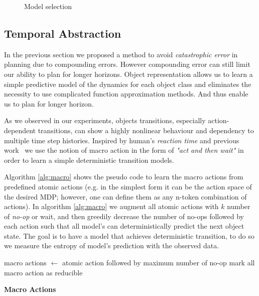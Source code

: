 \begin{figure}[tb]
    \centering

    \quad
    \quad
    \caption{Model selection}%
    
    \label{fig:pitfall:metaction}%
\end{figure}

\subsection{Temporal Abstraction}
In the previous section we proposed a method to avoid \textit{catastrophic error} in planning due to compounding errors. However compounding error can still limit our ability to plan for longer horizons. Object representation allows us to learn a simple predictive model of the dynamics for each object class and eliminates the necessity to use complicated function approximation methods. And thus enable us to plan for longer horizon.

As we observed in our experiments, objects transitions, especially action-dependent transitions, can show a highly nonlinear behaviour and dependency to multiple time step histories. Inspired by human's \textit{reaction time} and previous work~\citep{diuk2008object} we use the notion of macro action in the form of \textit{"act and then wait"} in order to learn a simple deterministic transition models. 

Algorithm \ref{alg:macro} shows the pseudo code to learn the macro actions from predefined atomic actions (e.g. in the simplest form it can be the action space of the desired MDP; however, one can define them as any n-token combination of actions). In algorithm \ref{alg:macro} we augment all atomic actions with $k$ number of \textit{no-op} or wait, and then greedily decrease the number of no-ops followed by each action such that all model's can deterministically predict the next object state. The  goal is to have a model that achieves deterministic transition, to do so we measure the entropy of model's prediction with the observed data. 

\begin{algorithm}
\SetAlgoLined
macro actions $\gets$ atomic action followed by maximum number of no-op\;
mark all macro action as reducible\;
 \caption{\bf Macro Actions}\label{alg:macro}
\end{algorithm}

